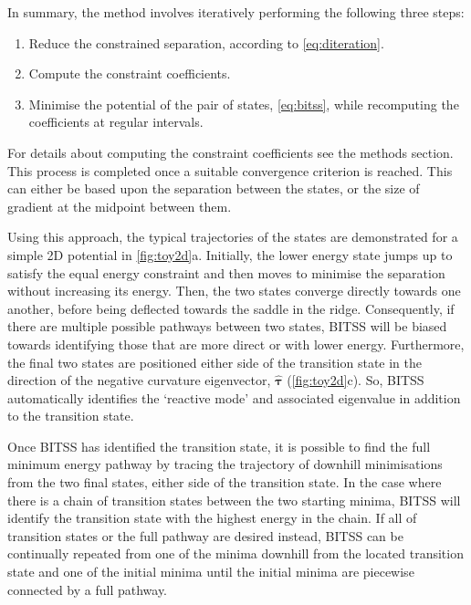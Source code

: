 \documentclass[twocolumn,10pt]{revtex4-2}
\begin{document}
In summary, the method involves iteratively performing the following three steps:
\begin{enumerate}
  \item Reduce the constrained separation, according to \cref{eq:diteration}.
  \item Compute the constraint coefficients.
  \item Minimise the potential of the pair of states, \cref{eq:bitss}, while recomputing the coefficients at regular intervals.
\end{enumerate}
For details about computing the constraint coefficients see the methods section.
This process is completed once a suitable convergence criterion is reached.
This can either be based upon the separation between the states, or the size of gradient at the midpoint between them.

Using this approach, the typical trajectories of the states are demonstrated for a simple 2D potential in \cref{fig:toy2d}a.
Initially, the lower energy state jumps up to satisfy the equal energy constraint and then moves to minimise the separation without increasing its energy.
Then, the two states converge directly towards one another, before being deflected towards the saddle in the ridge.
Consequently, if there are multiple possible pathways between two states, BITSS will be biased towards identifying those that are more direct or with lower energy.
Furthermore, the final two states are positioned either side of the transition state in the direction of the negative curvature eigenvector, $\bm{\hat{\tau}}$ (\cref{fig:toy2d}c).
So, BITSS automatically identifies the `reactive mode' and associated eigenvalue in addition to the transition state.

Once BITSS has identified the transition state, it is possible to find the full minimum energy pathway by tracing the trajectory of downhill minimisations from the two final states, either side of the transition state.
In the case where there is a chain of transition states between the two starting minima, BITSS will identify the transition state with the highest energy in the chain.
If all of transition states or the full pathway are desired instead, BITSS can be continually repeated from one of the minima downhill from the located transition state and one of the initial minima until the initial minima are piecewise connected by a full pathway.
\end{document}
